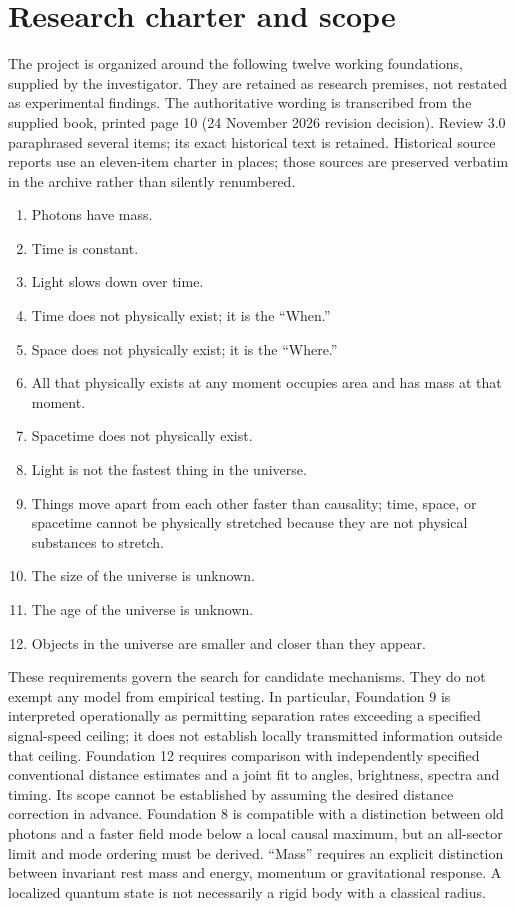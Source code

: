 \documentclass[
  11pt,
  twoside]{article}
\providecommand{\tightlist}{%
  \setlength{\itemsep}{0pt}\setlength{\parskip}{0pt}}
\begin{document}
\section{Research charter and scope}\label{research-charter-and-scope}

The project is organized around the following twelve working
foundations, supplied by the investigator. They are retained as research
premises, not restated as experimental findings. The authoritative
wording is transcribed from the supplied book, printed page 10 (24
November 2026 revision decision). Review 3.0 paraphrased several items;
its exact historical text is retained. Historical source reports use an
eleven-item charter in places; those sources are preserved verbatim in
the archive rather than silently renumbered.

\begin{enumerate}
\def\labelenumi{\arabic{enumi}.}
\tightlist
\item
  Photons have mass.
\item
  Time is constant.
\item
  Light slows down over time.
\item
  Time does not physically exist; it is the ``When.''
\item
  Space does not physically exist; it is the ``Where.''
\item
  All that physically exists at any moment occupies area and has mass at
  that moment.
\item
  Spacetime does not physically exist.
\item
  Light is not the fastest thing in the universe.
\item
  Things move apart from each other faster than causality; time, space,
  or spacetime cannot be physically stretched because they are not
  physical substances to stretch.
\item
  The size of the universe is unknown.
\item
  The age of the universe is unknown.
\item
  Objects in the universe are smaller and closer than they appear.
\end{enumerate}

These requirements govern the search for candidate mechanisms. They do
not exempt any model from empirical testing. In particular, Foundation 9
is interpreted operationally as permitting separation rates exceeding a
specified signal-speed ceiling; it does not establish locally
transmitted information outside that ceiling. Foundation 12 requires
comparison with independently specified conventional distance estimates
and a joint fit to angles, brightness, spectra and timing. Its scope
cannot be established by assuming the desired distance correction in
advance. Foundation 8 is compatible with a distinction between old
photons and a faster field mode below a local causal maximum, but an
all-sector limit and mode ordering must be derived. ``Mass'' requires an
explicit distinction between invariant rest mass and energy, momentum or
gravitational response. A localized quantum state is not necessarily a
rigid body with a classical radius.
\end{document}
